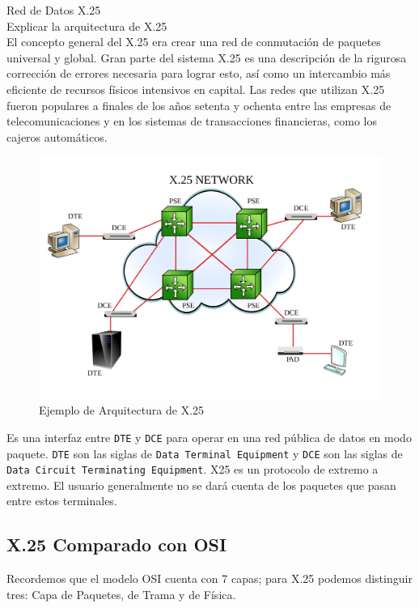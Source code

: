 {\color{red}\noindent Red de Datos X.25\\Explicar la arquitectura de X.25}\\

El concepto general del X.25 era crear una red de conmutación de paquetes universal y global. Gran parte del sistema X.25 es una descripción de la rigurosa corrección de errores necesaria para lograr esto, así como un intercambio más eficiente de recursos físicos intensivos en capital. Las redes que utilizan X.25 fueron populares a finales de los años setenta y ochenta entre las empresas de telecomunicaciones y en los sistemas de transacciones financieras, como los cajeros automáticos.

\begin{figure}[ht!]
\centering
\includegraphics[scale=0.13]{Imagenes/x25.pdf}
\caption{Ejemplo de Arquitectura de X.25}
\end{figure}

Es una interfaz entre \texttt{DTE} y \texttt{DCE} para operar en una red pública de datos en modo paquete. \texttt{DTE} son las siglas de \texttt{Data Terminal Equipment} y \texttt{DCE} son las siglas de \texttt{Data Circuit Terminating Equipment}. X25 es un protocolo de extremo a extremo. El usuario generalmente no se dará cuenta de los paquetes que pasan entre estos terminales.

\subsection*{X.25 Comparado con OSI}
Recordemos que el modelo OSI cuenta con 7 capas; para X.25 podemos distinguir tres: Capa de Paquetes, de Trama y de Física.

